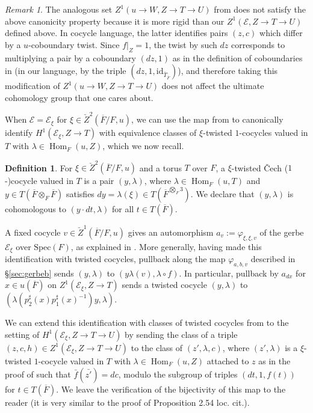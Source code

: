 \documentclass{amsart}
\theoremstyle{definition}
\newtheorem{definition}[result]{Definition}
\theoremstyle{remark}
\newtheorem{remark}[result]{Remark}
\DeclareMathOperator\Hom{Hom}
\newcommand\Spec{\mathrm{Spec}}
\newcommand{\ov}{\overline}
\begin{document}
\begin{remark}
    The analogous set $Z^{1}(u \to W, Z \to T \to U)$ from \cite{Kal26b} does not satisfy the above canonicity property because it is more rigid than our $Z^{1}(\mathcal{E}, Z \to T \to U)$ defined above. In cocycle language, the latter identifies pairs $(z,c)$ which differ by a $u$-coboundary twist. Since $f|_{Z}=1$, the twist by such $dz$ corresponds to multiplying a pair by a coboundary $(dz,1)$ as in the definition of coboundaries in \cite{Kal26b} (in our language, by the triple $(dz,1,\text{id}_{\bar{T}_{\ov{F}}})$), and therefore taking this modification of $Z^{1}(u \to W, Z \to T \to U)$ does not affect the ultimate cohomology group that one cares about. 
\end{remark}



When $\mathcal{E}=\mathcal{E}_{\xi}$ for $\xi \in \check{Z}^{2}(\ov{F}/F,u)$, we can use the map from \cite[Proposition 2.54]{Dillery1} to canonically identify $H^{1}(\mathcal{E}_{\xi}, Z \to T)$ with equivalence classes of $\xi$-twisted $1$-cocycles valued in $T$ with $\lambda \in \Hom_{F}(u,Z)$, which we now recall.

\begin{definition}
    For $\xi \in \check{Z}^{2}(\ov{F}/F, u)$ and a torus $T$ over $F$, a $\xi$-twisted \v{C}ech ($1$-)cocycle valued in $T$ is a pair $(y, \lambda)$, where $\lambda \in \Hom_{F}(u,T)$ and $y \in T(\ov{F} \otimes_{F} \ov{F})$ satisfies $dy = \lambda(\xi) \in T(\ov{F}^{\bigotimes_{F}3})$. We declare that $(y,\lambda)$ is cohomologous to $(y\cdot dt, \lambda)$ for all $t \in T(\ov{F})$.
\end{definition}

A fixed cocycle $v \in \check{Z}^{1}(\ov{F}/F,u)$ gives an automorphism $a_{v}:=\varphi_{\xi,\xi,v}$ of the gerbe $\mathcal{E}_{\xi}$ over $\Spec(F)$, as explained in \cite[\S 2.3]{Dillery1}. More generally, having made this identification with twisted cocycles, pullback along the map $\varphi_{a,b,v}$ described in \S \ref{sec:gerbeb} sends $(y,\lambda)$ to $(y\lambda(v),\lambda \circ f)$. In particular, pullback by $a_{dx}$ for $x \in u(\ov{F})$ on $Z^{1}(\mathcal{E}_{\xi}, Z \to T)$ sends a twisted cocycle $(y,\lambda)$ to $(\lambda(p_{2}^{\sharp}(x)p_{1}^{\sharp}(x)^{-1})y,\lambda)$.


We can extend this identification with classes of twisted cocycles from \cite[Proposition 2.54]{Dillery1} to the setting of $H^{1}(\mathcal{E}_{\xi}, Z \to T \to U)$ by sending the class of a triple $(z,c,h) \in Z^{1}(\mathcal{E}_{\xi}, Z \to T \to U)$ to the class of $(z',\lambda,c)$, where $(z',\lambda)$ is a $\xi$-twisted $1$-cocycle valued in $T$ with $\lambda \in \Hom_{F}(u,Z)$ attached to $z$ as in the proof of \cite[Proposition 2.54]{Dillery1} such that $\bar{f}(\bar{z'}) = dc$, modulo the subgroup of triples $(dt,1,f(t))$ for $t \in T(\ov{F})$. We leave the verification of the bijectivity of this map to the reader (it is very similar to the proof of Proposition 2.54 loc. cit.).
\end{document}
